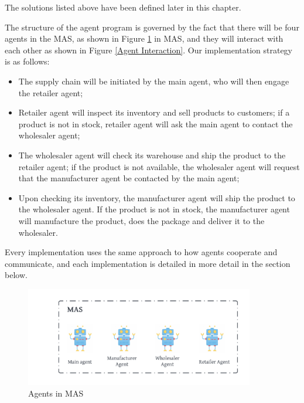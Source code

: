 The solutions listed above have been defined later in this chapter.

\vspace{.5cm }

The structure of the agent program is governed by the fact that there will be four agents in the \ac{MAS}, as shown in Figure \ref{Agents in MAS} in MAS, and they will interact with each other as shown in Figure \ref{Agent Interaction}. Our implementation strategy is as follows:

\begin{itemize}
    \item The supply chain will be initiated by the main agent, who will then engage the retailer agent;
    
    \vspace{.5cm}
    
    \item Retailer agent will inspect its inventory and sell products to customers; if a product is not in stock, retailer agent will ask the main agent to contact the wholesaler agent;
    
    \vspace{.5cm}
    
    \item The wholesaler agent will check its warehouse and ship the product to the retailer agent; if the product is not available, the wholesaler agent will request that the manufacturer agent be contacted by the main agent;
    
    \vspace{.5cm}
    
    \item Upon checking its inventory, the manufacturer agent will ship the product to the wholesaler agent. If the product is not in stock, the manufacturer agent will manufacture the product, does the package and deliver it to the wholesaler.
    
    \vspace{.5cm}
    
\end{itemize}

Every implementation uses the same approach to how agents cooperate and communicate, and each implementation is detailed in more detail in the section below.

\begin{figure}[h]
\centering
  \includegraphics[width=10cm]{includes/figures/MAS.png} 
  \caption{Agents in \ac{MAS}}
  \label{Agents in MAS}
\end{figure}

